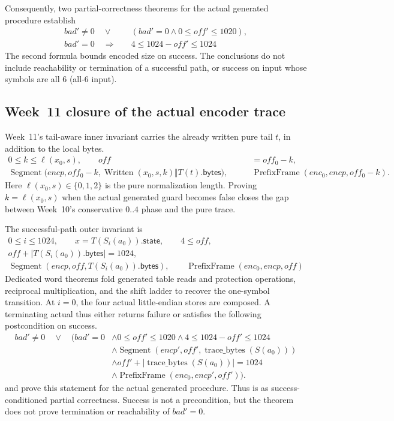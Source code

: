 Consequently, two partial-correctness theorems for the actual generated
procedure establish
\[
\begin{aligned}
 bad'\ne0\quad\lor\quad
   &(bad'=0\land 0\le off'\le1020),\\
 bad'=0\quad\Longrightarrow\quad
   &4\le1024-off'\le1024
\end{aligned}
\]
The second formula bounds encoded size on success. The conclusions do not
include reachability or termination of a successful path, or success on input whose symbols are all 6 (all-6 input).

\subsection{Week~11 closure of the actual encoder trace}

Week~11's tail-aware inner invariant carries the already written pure tail
\(t\), in addition to the local bytes.
\[
\begin{aligned}
 0\le k\le\ell(x_0,s),\qquad
 off&=off_0-k,\\
 \operatorname{Segment}\bigl(encp,off_0-k,
   \operatorname{Written}(x_0,s,k)\Vert T(t).\mathsf{bytes}\bigr),\qquad
 &\operatorname{PrefixFrame}(enc_0,encp,off_0-k).
\end{aligned}
\]
Here \(\ell(x_0,s)\in\{0,1,2\}\) is the pure normalization length. Proving
\(k=\ell(x_0,s)\) when the actual generated guard becomes false closes the gap
between Week~10's conservative \(0..4\) phase and the pure trace.

The successful-path outer invariant is
\[
\begin{gathered}
  0\le i\le1024,\qquad
  x=T(S_i(a_0)).\mathsf{state},\qquad 4\le off,\\
  off+|T(S_i(a_0)).\mathsf{bytes}|=1024,\\
  \operatorname{Segment}(encp,off,T(S_i(a_0)).\mathsf{bytes}),\qquad
  \operatorname{PrefixFrame}(enc_0,encp,off)
\end{gathered}
\]
Dedicated word theorems fold generated table reads and protection operations,
reciprocal multiplication, and the shift ladder to recover the one-symbol
transition. At \(i=0\), the four actual little-endian stores are composed.
A terminating actual  thus either returns failure
or satisfies the following postcondition on success.
\[
\begin{aligned}
 bad'\ne0\quad\lor\quad\bigl(bad'=0
 &\land 0\le off'\le1020
 \land 4\le1024-off'\le1024\\
 &\land\operatorname{Segment}(encp',off',
       \operatorname{trace\_bytes}(S(a_0)))\\
 &\land off'+|\operatorname{trace\_bytes}(S(a_0))|=1024\\
 &\land\operatorname{PrefixFrame}(enc_0,encp',off')\bigr).
\end{aligned}
\]
 and
 prove this statement for the
actual generated procedure. Thus  is
\statusproved as success-conditioned partial correctness. Success is not a
precondition, but the theorem does not prove termination or reachability of \(bad'=0\).


